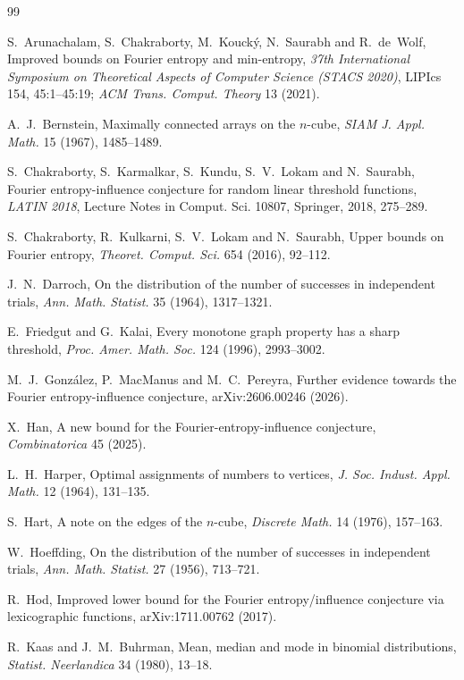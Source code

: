 \documentclass[11pt]{amsart}
\theoremstyle{definition}
\theoremstyle{remark}
\begin{document}
\begin{thebibliography}{99}

 S.~Arunachalam, S.~Chakraborty, M.~Kouck\'y, N.~Saurabh and R.~de~Wolf, Improved bounds on
Fourier entropy and min-entropy, \emph{37th International Symposium on Theoretical Aspects of Computer Science
(STACS 2020)}, LIPIcs 154, 45:1--45:19; \emph{ACM Trans. Comput. Theory} 13 (2021).

 A.~J.~Bernstein, Maximally connected arrays on the $n$-cube, \emph{SIAM J. Appl. Math.} 15 (1967),
1485--1489.

 S.~Chakraborty, S.~Karmalkar, S.~Kundu, S.~V.~Lokam and N.~Saurabh, Fourier entropy-influence
conjecture for random linear threshold functions, \emph{LATIN 2018}, Lecture Notes in Comput. Sci. 10807,
Springer, 2018, 275--289.

 S.~Chakraborty, R.~Kulkarni, S.~V.~Lokam and N.~Saurabh, Upper bounds on Fourier entropy,
\emph{Theoret. Comput. Sci.} 654 (2016), 92--112.

 J.~N.~Darroch, On the distribution of the number of successes in independent trials, \emph{Ann. Math.
Statist.} 35 (1964), 1317--1321.

 E.~Friedgut and G.~Kalai, Every monotone graph property has a sharp threshold, \emph{Proc. Amer.
Math. Soc.} 124 (1996), 2993--3002.

 M.~J.~Gonz\'alez, P.~MacManus and M.~C.~Pereyra, Further evidence towards the Fourier
entropy-influence conjecture, arXiv:2606.00246 (2026).

 X.~Han, A new bound for the Fourier-entropy-influence conjecture, \emph{Combinatorica} 45 (2025).

 L.~H.~Harper, Optimal assignments of numbers to vertices, \emph{J. Soc. Indust. Appl. Math.} 12
(1964), 131--135.

 S.~Hart, A note on the edges of the $n$-cube, \emph{Discrete Math.} 14 (1976), 157--163.

 W.~Hoeffding, On the distribution of the number of successes in independent trials, \emph{Ann. Math.
Statist.} 27 (1956), 713--721.

 R.~Hod, Improved lower bound for the Fourier entropy/influence conjecture via lexicographic
functions, arXiv:1711.00762 (2017).

 R.~Kaas and J.~M.~Buhrman, Mean, median and mode in binomial distributions, \emph{Statist. Neerlandica}
34 (1980), 13--18.


\end{thebibliography}
\end{document}
